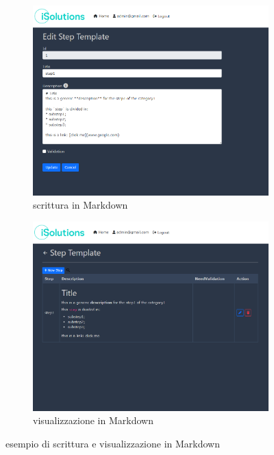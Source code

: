 \begin{figure}[ht]
	\centering
	\begin{subfigure}{0.3\textwidth}
		\includegraphics[width=1.4\textwidth]{img/markdown_p1.png}
		\caption{scrittura in Markdown}
	\end{subfigure}%
	\begin{subfigure}{0.3\textwidth}
		\includegraphics[width=1.4\textwidth]{img/markdown_pt2.png}
		\caption{visualizzazione in Markdown}
	\end{subfigure}
	\caption{esempio di scrittura e visualizzazione in Markdown}
	\label{fig:two}
\end{figure}
